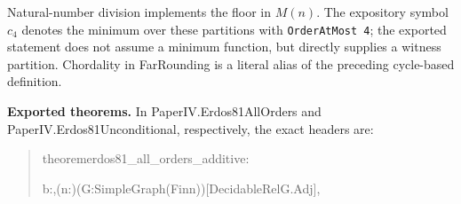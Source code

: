 \documentclass[english,11pt,a4paper]{article}
\newlength{\LeanCharWidth}
\begin{document}
Natural-number division implements the floor in \(M(n)\). The expository symbol \(c_4\) denotes the minimum over these partitions with \mbox{\texttt{OrderAtMost\ 4}}; the exported statement does not assume a minimum function, but directly supplies a witness partition. Chordality in {\ttfamily\small FarRounding} is a literal alias of the preceding cycle-based definition.

\textbf{Exported theorems.} In {\ttfamily\small PaperIV.\discretionary{\hbox{\ensuremath{\hookrightarrow}}}{}{}Erdos81AllOr\discretionary{\hbox{\ensuremath{\hookrightarrow}}}{}{}ders} and {\ttfamily\small PaperIV.\discretionary{\hbox{\ensuremath{\hookrightarrow}}}{}{}Erdos81Uncon\discretionary{\hbox{\ensuremath{\hookrightarrow}}}{}{}ditional}, respectively, the exact headers are:

\begin{quote}\fontsize{8.5}{10.2}\selectfont\ttfamily\raggedright\setlength{\parskip}{0pt}\settowidth{\LeanCharWidth}{0}
\noindent theorem\hspace*{\dimexpr 1\LeanCharWidth\relax}erdos81\_all\_orders\_additive\hspace*{\dimexpr 1\LeanCharWidth\relax}:\par
\noindent \hspace*{\dimexpr 4\LeanCharWidth\relax}{\LeanSymbols ∃}\hspace*{\dimexpr 1\LeanCharWidth\relax}b\hspace*{\dimexpr 1\LeanCharWidth\relax}:\hspace*{\dimexpr 1\LeanCharWidth\relax}{\LeanSymbols ℕ},\hspace*{\dimexpr 1\LeanCharWidth\relax}{\LeanSymbols ∀}\hspace*{\dimexpr 1\LeanCharWidth\relax}(n\hspace*{\dimexpr 1\LeanCharWidth\relax}:\hspace*{\dimexpr 1\LeanCharWidth\relax}{\LeanSymbols ℕ})\hspace*{\dimexpr 1\LeanCharWidth\relax}(G\hspace*{\dimexpr 1\LeanCharWidth\relax}:\hspace*{\dimexpr 1\LeanCharWidth\relax}SimpleGraph\hspace*{\dimexpr 1\LeanCharWidth\relax}(Fin\hspace*{\dimexpr 1\LeanCharWidth\relax}n))\hspace*{\dimexpr 1\LeanCharWidth\relax}[DecidableRel\hspace*{\dimexpr 1\LeanCharWidth\relax}G.Adj],\par

\end{quote}
\end{document}
